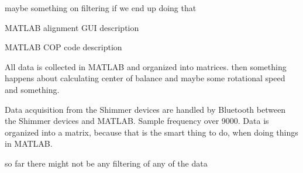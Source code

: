 maybe something on filtering if we end up doing that

MATLAB alignment GUI description

MATLAB COP code description





All data is collected in MATLAB and organized into matrices. then something happens about calculating center of balance and maybe some rotational speed and something. 

Data acquisition from the Shimmer devices are handled by Bluetooth between the Shimmer devices and MATLAB. Sample frequency over 9000. Data is organized into a matrix, because that is the smart thing to do, when doing things in MATLAB.



so far there might not be any filtering of any of the data


